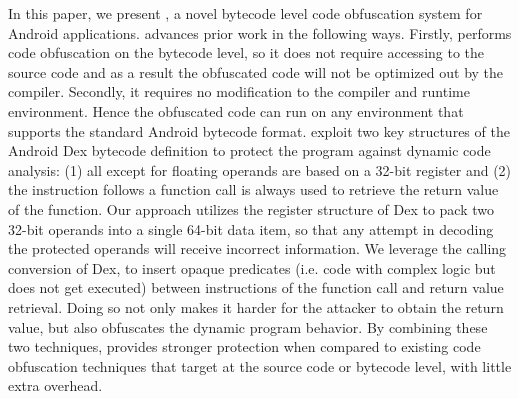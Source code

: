 %

In this paper, we present \ToolName, a novel bytecode level code obfuscation system for Android applications. \ToolName advances prior work in the following ways. Firstly, \ToolName performs code obfuscation on the bytecode level, so it does not require accessing to the source code and as a result the obfuscated code will not be optimized out by the compiler. Secondly, 
it requires no modification to the compiler and runtime environment. Hence the obfuscated code can run on any environment that supports the standard Android bytecode format. 
\ToolName exploit two key structures of the Android Dex bytecode definition to protect the program against dynamic code analysis: (1) all except for floating operands are based on a 32-bit register and (2) the instruction follows a function call is always used to retrieve the return value of the function. Our approach utilizes the register structure of Dex to pack two 32-bit operands into a single 64-bit data item, so that any attempt in decoding the protected operands will receive incorrect information. We leverage the calling conversion of Dex, to insert opaque predicates (i.e. code with complex logic but does not get executed) between instructions of the function call and return value retrieval. Doing so not only makes it harder for the attacker to obtain the return value, but also obfuscates the dynamic program behavior. By combining these two techniques, \ToolName provides stronger protection when compared to existing code obfuscation techniques that target at the source code or bytecode level, with little extra overhead.


